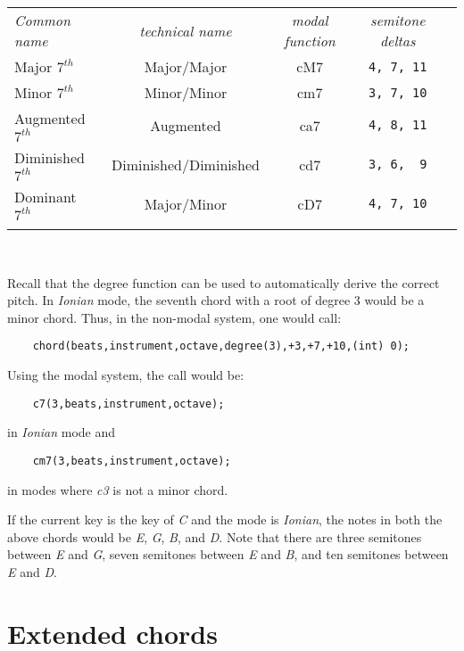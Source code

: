 \documentclass{article}
\begin{document}
\begin{center}
\begin{tabular}{lcccr}
\T\toprule
{\it Common name} & {\it technical name} & {\it modal function} 
    & {\it semitone deltas}\\
\T\midrule
Major $7^{th}$ & Major/Major & cM7 & {\tt 4, 7, 11}\\
Minor $7^{th}$ & Minor/Minor & cm7 & {\tt 3, 7, 10}\\
Augmented $7^{th}$ & Augmented & ca7 & {\tt 4, 8, 11}\\
Diminished $7^{th}$ & Diminished/Diminished & cd7 & {\tt 3, 6, ~9}\\
Dominant $7^{th}$ & Major/Minor & cD7 & {\tt 4, 7, 10}\\
\T\bottomrule
\end{tabular}
\end{center}

\W ~\newline

Recall that the degree function can be used to automatically derive the
correct pitch. In {\it Ionian} mode, the seventh chord with a root of degree 3
would be a minor chord. Thus, in the non-modal system, one would
call:

\begin{verbatim}
    chord(beats,instrument,octave,degree(3),+3,+7,+10,(int) 0);
\end{verbatim}

Using the modal system, the call would be:

\begin{verbatim}
    c7(3,beats,instrument,octave);
\end{verbatim}

in {\it Ionian} mode and 

\begin{verbatim}
    cm7(3,beats,instrument,octave);
\end{verbatim}

in modes where {\it c3} is not a minor chord.
    
If the current key is the key of {\it C} and the mode is {\it Ionian}, the
notes in both the above chords would be {\it E}, {\it G}, {\it B},
and {\it D}.
Note that there
are three semitones between {\it E} and {\it G}, seven semitones between
{\it E} and {\it B}, and ten semitones between {\it E} and {\it D}.

\section*{Extended chords}
\end{document}
